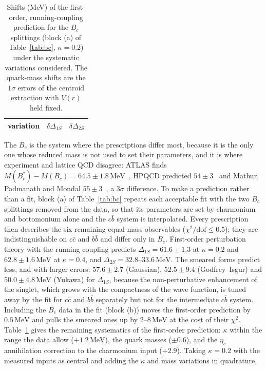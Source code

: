 \documentclass[10pt,twocolumn]{article}
\newcommand{\Bc}{B_c}
\newcommand{\Bcs}{B_c^*}
\newcommand{\cc}{c\bar c}
\newcommand{\bb}{b\bar b}
\newcommand{\cb}{c\bar b}
\newcommand{\MeV}{\,\mathrm{MeV}}
\begin{document}
\begin{table}[t]
\caption{Shifts (MeV) of the first-order, running-coupling prediction for the $\Bc$ splittings (block (a) of Table~\ref{tab:bc}, $\kappa=0.2$) under the systematic variations considered. The quark-mass shifts are the $1\sigma$ errors of the centroid extraction with $V(r)$ held fixed.}
\label{tab:syst}
\centering\small
\begin{tabular}{lcc}
\toprule
variation & $\delta\Delta_{1S}$ & $\delta\Delta_{2S}$ \\
\midrule

\end{tabular}
\end{table}

The $\Bc$ is the system where the prescriptions differ most, because it is the only one whose reduced mass is not used to set their parameters, and it is where experiment and lattice QCD disagree: ATLAS finds $M(\Bcs)-M(\Bc)=64.5\pm1.8\MeV$~\cite{ATLAS2026}, HPQCD predicted $54\pm3$~\cite{Dowdall2012} and Mathur, Padmanath and Mondal $55\pm3$~\cite{Mathur2018}, a $3\sigma$ difference.
To make a prediction rather than a fit, block (a) of Table~\ref{tab:bc} repeats each acceptable fit with the two $\Bc$ splittings removed from the data, so that its parameters are set by charmonium and bottomonium alone and the $\cb$ system is interpolated.
Every prescription then describes the six remaining equal-mass observables ($\chi^2/\mathrm{dof}\le0.5$); they are indistinguishable on $\cc$ and $\bb$ and differ only in $\Bc$.
First-order perturbation theory with the running coupling predicts $\Delta_{1S}=61.6\pm1.3$ at $\kappa=0.2$ and $62.8\pm1.6\MeV$ at $\kappa=0.4$, and $\Delta_{2S}=32.8$--$33.6\MeV$.
The smeared forms predict less, and with larger errors: $57.6\pm2.7$ (Gaussian), $52.5\pm9.4$ (Godfrey--Isgur) and $50.0\pm4.8\MeV$ (Yukawa) for $\Delta_{1S}$, because the non-perturbative enhancement of the singlet, which grows with the compactness of the wave function, is tuned away by the fit for $\cc$ and $\bb$ separately but not for the intermediate $\cb$ system.
Including the $\Bc$ data in the fit (block (b)) moves the first-order prediction by $0.5\MeV$ and pulls the smeared ones up by $2$--$8\MeV$ at the cost of their $\chi^2$.
Table~\ref{tab:syst} gives the remaining systematics of the first-order prediction: $\kappa$ within the range the data allow ($+1.2\MeV$), the quark masses ($\pm0.6$), and the $\eta_c$ annihilation correction to the charmonium input ($+2.9$).
Taking $\kappa=0.2$ with the measured inputs as central and adding the $\kappa$ and mass variations in quadrature,
\end{document}
